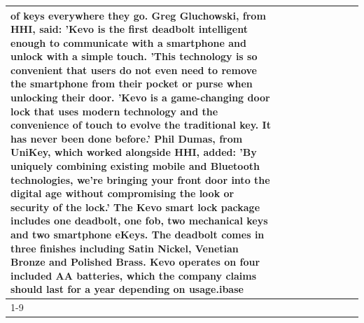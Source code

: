 \begin{table}[H]
\begin{tabular}{lllrlllll}
of keys everywhere they go. Greg Gluchowski, from HHI, said: 'Kevo is the first deadbolt intelligent enough to communicate with a smartphone and unlock with a simple touch. 'This technology is so convenient that users do not even need to remove the smartphone from their pocket or purse when unlocking their door. 'Kevo is a game-changing door lock that uses modern technology and the convenience of touch to evolve the traditional key. It has never been done before.' Phil Dumas, from UniKey, which worked alongside HHI, added: 'By uniquely combining existing mobile and Bluetooth technologies, we’re bringing your front door into the digital age without compromising the look or security of the lock.' The Kevo smart lock package includes one deadbolt, one fob, two mechanical keys and two smartphone eKeys. The deadbolt comes in three finishes including Satin Nickel, Venetian Bronze and Polished Brass. Kevo operates on four included AA batteries, which the company claims should last for a year depending on usage.ibase \\
\cline{1-9}

\end{tabular}
\end{table}
